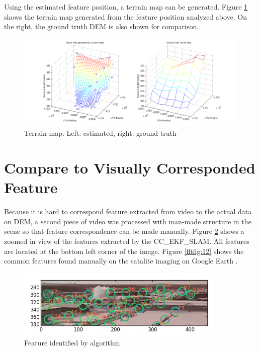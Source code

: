 Using the estimated feature position, a terrain map can be generated.
Figure \ref{fltfig:10} shows the terrain map generated from the
feature position analyzed above. On the right, the ground truth DEM is
also shown for comparison. 

\begin{figure}[h]
\centering
\includegraphics[width=14cm, keepaspectratio=true]
{./Figures/fltfig/cut1/terrain/terrain_map_cmp.png}
\caption{Terrain map. Left: estimated, right: ground truth }
\label{fltfig:10}
\end{figure}

\section{Compare to Visually Corresponded Feature}
Because it is hard to correspond feature extracted from video to the
actual data on DEM, a second piece of video was processed with
man-made structure in the scene so that feature correspondence can be
made manually. Figure \ref{fltfig:11} shows a zoomed in view of the
features extracted by the CC\_EKF\_SLAM. All features are located at
the bottom left corner of the image. Figure \ref{fltfig:12} shows the
common features found manually on the satalite imaging on Google Earth
\cite{}.

\begin{figure}[h]
\centering
\includegraphics[width=10cm, keepaspectratio=true]
{./Figures/fltfig/airport/frame398_features.jpg}
\caption{Feature identified by algorithm }
\label{fltfig:11}
\end{figure}

